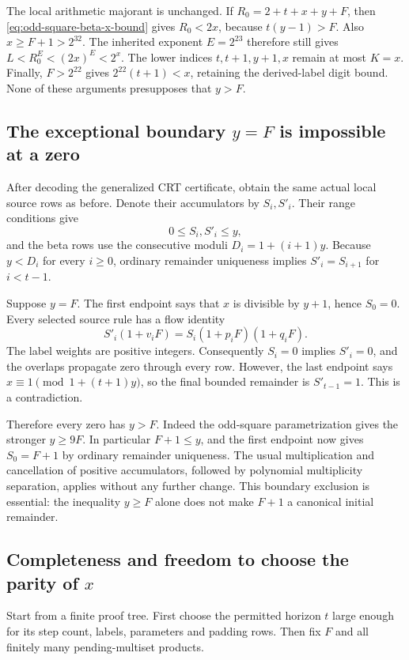 The local arithmetic majorant is unchanged.  If
$R_0=2+t+x+y+F$, then \eqref{eq:odd-square-beta-x-bound} gives
$R_0<2x$, because
$t(y-1)>F$.  Also $x\ge F+1>2^{32}$.  The inherited exponent
$E=2^{23}$ therefore still gives
$L<R_0^E<(2x)^E<2^x$.  The lower indices $t,t+1,y+1,x$ remain at most
$K=x$.  Finally, $F>2^{22}$ gives
$2^{22}(t+1)<x$, retaining the derived-label digit bound.  None of
these arguments presupposes that $y>F$.

\subsection{The exceptional boundary $y=F$ is impossible at a zero}

After decoding the generalized CRT certificate, obtain the same actual
local source rows as before.  Denote their accumulators by $S_i,S'_i$.
Their range conditions give
\[
 0\le S_i,S'_i\le y,
\]
and the beta rows use the consecutive moduli
$D_i=1+(i+1)y$.  Because $y<D_i$ for every $i\ge0$, ordinary
remainder uniqueness implies $S'_i=S_{i+1}$ for $i<t-1$.

Suppose $y=F$.  The first endpoint says that $x$ is divisible by
$y+1$, hence $S_0=0$.  Every selected source rule has a flow identity
\[
 S'_i(1+v_iF)=S_i(1+p_iF)(1+q_iF).
\]
The label weights are positive integers.  Consequently $S_i=0$ implies
$S'_i=0$, and the overlaps propagate zero through every row.  However,
the last endpoint says $x\equiv1\pmod{1+(t+1)y}$, so the final
bounded remainder is $S'_{t-1}=1$.  This is a contradiction.

Therefore every zero has $y>F$.  Indeed the odd-square parametrization
gives the stronger $y\ge9F$.  In particular $F+1\le y$, and the first
endpoint now gives $S_0=F+1$ by ordinary remainder uniqueness.  The
usual multiplication and cancellation of positive accumulators, followed
by polynomial multiplicity separation, applies without any further
change.  This boundary exclusion is essential: the inequality $y\ge F$
alone does not make $F+1$ a canonical initial remainder.

\subsection{Completeness and freedom to choose the parity of $x$}

Start from a finite proof tree.  First choose the permitted horizon $t$
large enough for its step count, labels, parameters and padding rows.
Then fix $F$ and all finitely many pending-multiset products.

